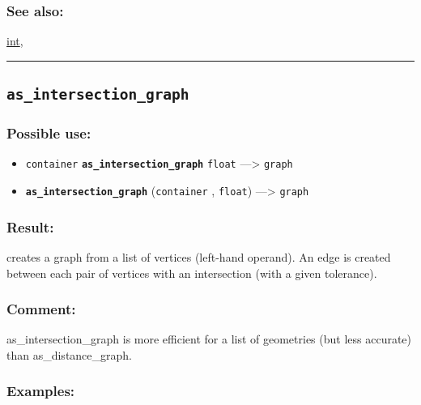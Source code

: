 \documentclass[]{book}
\providecommand{\tightlist}{%
  \setlength{\itemsep}{0pt}\setlength{\parskip}{0pt}}
\theoremstyle{definition}
\theoremstyle{definition}
\theoremstyle{definition}
\theoremstyle{remark}
\begin{document}
\subsubsection{See also:}\label{see-also-35}

\href{OperatorsIM\#int}{int},

\begin{center}\rule{0.5\linewidth}{\linethickness}\end{center}

\subsection{\texorpdfstring{\texttt{as\_intersection\_graph}}{as\_intersection\_graph}}\label{as_intersection_graph}

\subsubsection{Possible use:}\label{possible-use-51}

\begin{itemize}
\tightlist
\item
  \texttt{container} \textbf{\texttt{as\_intersection\_graph}}
  \texttt{float} ---\textgreater{} \texttt{graph}
\item
  \textbf{\texttt{as\_intersection\_graph}} (\texttt{container} ,
  \texttt{float}) ---\textgreater{} \texttt{graph}
\end{itemize}

\subsubsection{Result:}\label{result-50}

creates a graph from a list of vertices (left-hand operand). An edge is
created between each pair of vertices with an intersection (with a given
tolerance).

\subsubsection{Comment:}\label{comment-10}

as\_intersection\_graph is more efficient for a list of geometries (but
less accurate) than as\_distance\_graph.

\subsubsection{Examples:}\label{examples-42}
\end{document}
